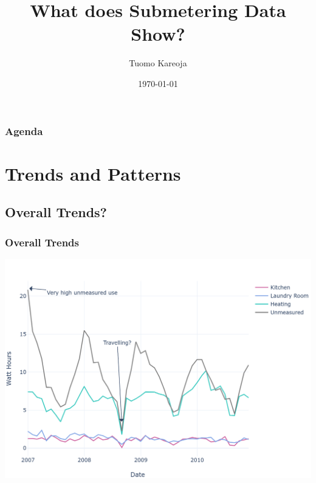 \documentclass[10pt]{beamer}
\title[Data Science in Blackwell]{What does Submetering Data Show?} %
\author{Tuomo Kareoja} %
\institute[IOT Analytics] %
{
IOT Analytics \\ %
\medskip
}
\date{\today} %
\begin{document}
\begin{frame}
\titlepage %
\end{frame}

\begin{frame}
\frametitle{Agenda} %
\tableofcontents %
\end{frame}


\section{Trends and Patterns}

\subsection{Overall Trends?}

\begin{frame}
\frametitle{Overall Trends}

{
    \centering
    \includegraphics[width=\textwidth,height=\textheight,keepaspectratio]{energy_use_overall_trends.png}
    \par
}

\end{frame}
\end{document}
